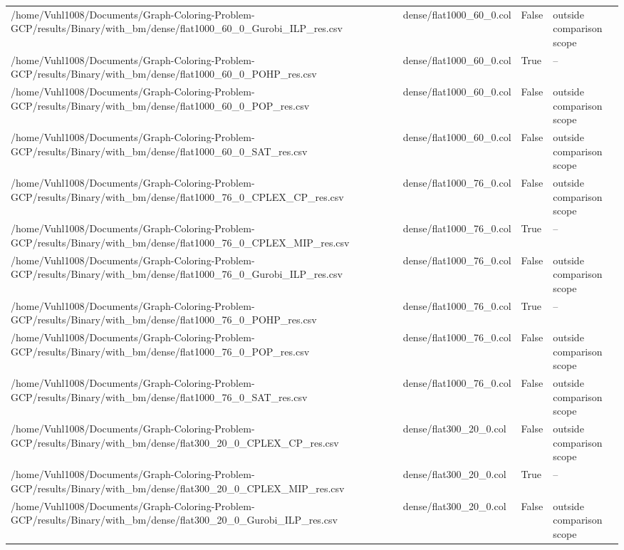 \begin{table}[htbp]
\begin{tabular}{llll}
/home/Vuhl1008/Documents/Graph-Coloring-Problem-GCP/results/Binary/with\_bm/dense/flat1000\_60\_0\_Gurobi\_ILP\_res.csv & dense/flat1000\_60\_0.col & False & outside comparison scope \\
/home/Vuhl1008/Documents/Graph-Coloring-Problem-GCP/results/Binary/with\_bm/dense/flat1000\_60\_0\_POHP\_res.csv & dense/flat1000\_60\_0.col & True & -- \\
/home/Vuhl1008/Documents/Graph-Coloring-Problem-GCP/results/Binary/with\_bm/dense/flat1000\_60\_0\_POP\_res.csv & dense/flat1000\_60\_0.col & False & outside comparison scope \\
/home/Vuhl1008/Documents/Graph-Coloring-Problem-GCP/results/Binary/with\_bm/dense/flat1000\_60\_0\_SAT\_res.csv & dense/flat1000\_60\_0.col & False & outside comparison scope \\
/home/Vuhl1008/Documents/Graph-Coloring-Problem-GCP/results/Binary/with\_bm/dense/flat1000\_76\_0\_CPLEX\_CP\_res.csv & dense/flat1000\_76\_0.col & False & outside comparison scope \\
/home/Vuhl1008/Documents/Graph-Coloring-Problem-GCP/results/Binary/with\_bm/dense/flat1000\_76\_0\_CPLEX\_MIP\_res.csv & dense/flat1000\_76\_0.col & True & -- \\
/home/Vuhl1008/Documents/Graph-Coloring-Problem-GCP/results/Binary/with\_bm/dense/flat1000\_76\_0\_Gurobi\_ILP\_res.csv & dense/flat1000\_76\_0.col & False & outside comparison scope \\
/home/Vuhl1008/Documents/Graph-Coloring-Problem-GCP/results/Binary/with\_bm/dense/flat1000\_76\_0\_POHP\_res.csv & dense/flat1000\_76\_0.col & True & -- \\
/home/Vuhl1008/Documents/Graph-Coloring-Problem-GCP/results/Binary/with\_bm/dense/flat1000\_76\_0\_POP\_res.csv & dense/flat1000\_76\_0.col & False & outside comparison scope \\
/home/Vuhl1008/Documents/Graph-Coloring-Problem-GCP/results/Binary/with\_bm/dense/flat1000\_76\_0\_SAT\_res.csv & dense/flat1000\_76\_0.col & False & outside comparison scope \\
/home/Vuhl1008/Documents/Graph-Coloring-Problem-GCP/results/Binary/with\_bm/dense/flat300\_20\_0\_CPLEX\_CP\_res.csv & dense/flat300\_20\_0.col & False & outside comparison scope \\
/home/Vuhl1008/Documents/Graph-Coloring-Problem-GCP/results/Binary/with\_bm/dense/flat300\_20\_0\_CPLEX\_MIP\_res.csv & dense/flat300\_20\_0.col & True & -- \\
/home/Vuhl1008/Documents/Graph-Coloring-Problem-GCP/results/Binary/with\_bm/dense/flat300\_20\_0\_Gurobi\_ILP\_res.csv & dense/flat300\_20\_0.col & False & outside comparison scope \\

\end{tabular}
\end{table}
